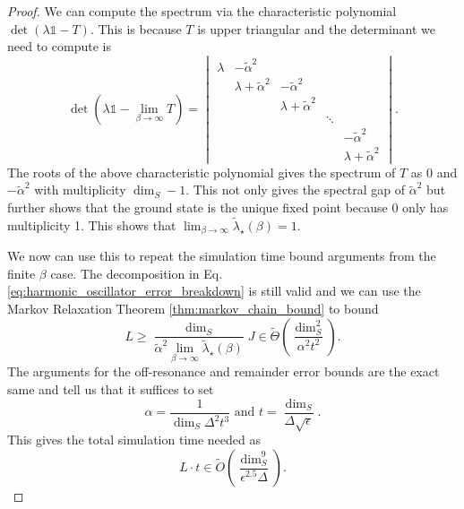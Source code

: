 \documentclass[
 amsmath,amssymb,
 aps,
onecolumn, 
nofootinbib]{revtex4-2}
\newcommand{\bigotilde}[1]{\widetilde{O} \left( #1 \right)}
\newcommand{\identity}{\mathds{1}}
\begin{document}
\begin{proof}
We can compute the spectrum via the characteristic polynomial $\det(\lambda \identity - T)$. This is because $T$ is upper triangular and the determinant we need to compute is
\begin{equation}
    \det \left(\lambda \identity - \lim_{\beta \to \infty} T \right) =  \begin{vmatrix}
        \lambda & -\widetilde{\alpha}^2 &   &\\
        & \lambda + \widetilde{\alpha}^2 & -\widetilde{\alpha}^2 &  &\\
        & & \lambda + \widetilde{\alpha}^2  & & \\
        & & & \ddots & \\
        & &     &       & -\widetilde{\alpha}^2 \\
        & &  & & \lambda + \widetilde{\alpha}^2
    \end{vmatrix}.
\end{equation}
    The roots of the above characteristic polynomial gives the spectrum of $T$ as 0 and $-\widetilde{\alpha}^2$ with multiplicity $\dim_S - 1$. This not only gives the spectral gap of $\widetilde{\alpha}^2$ but further shows that the ground state is the unique fixed point because 0 only has multiplicity 1. This shows that $\lim_{\beta \to \infty} \widetilde{\lambda}_\star(\beta) = 1$.

    We now can use this to repeat the simulation time bound arguments from the finite $\beta$ case. The decomposition in Eq. \eqref{eq:harmonic_oscillator_error_breakdown} is still valid and we can use the Markov Relaxation Theorem \ref{thm:markov_chain_bound} to bound
    \begin{equation}
        L \ge \frac{\dim_S}{\widetilde{\alpha}^2\lim_{\beta \to \infty} \widetilde{\lambda}_\star(\beta)} J \in \widetilde{\Theta}\left({\frac{\dim_S^2}{\alpha^2 t^2}}\right).
    \end{equation}
    The arguments for the off-resonance and remainder error bounds are the exact same and tell us that it suffices to set
    \begin{equation}
        \alpha = \frac{1}{\dim_S \Delta^2 t^3} \text{ and } t = \frac{\dim_S}{\Delta \sqrt{\epsilon}}.
    \end{equation}
    This gives the total simulation time needed as
    \begin{equation}
        L\cdot t \in \bigotilde{\frac{\dim_S^9}{\epsilon^{2.5} \Delta}}.
    \end{equation}
\end{proof}
\end{document}
